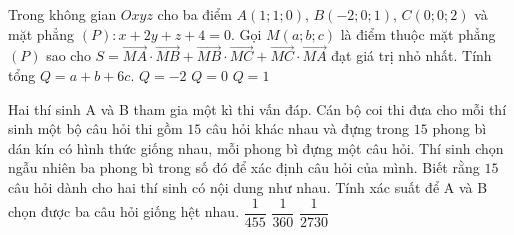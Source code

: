 \begin{ex}%
Trong không gian $Oxyz$ cho ba điểm $A(1;1;0)$, $B(-2;0;1)$, $C(0;0;2)$ và mặt phẳng $(P)\colon x+2y+z+4=0$. Gọi $M(a;b;c)$ là điểm thuộc mặt phẳng $(P)$ sao cho $S=\overrightarrow{MA}\cdot\overrightarrow{MB}+\overrightarrow{MB}\cdot\overrightarrow{MC}+\overrightarrow{MC}\cdot\overrightarrow{MA}$ đạt giá trị nhỏ nhất. Tính tổng $Q=a+b+6c$.
{\True $Q=-2$}
{$Q=0$}
{$Q=1$}
\end{ex}

\begin{ex}%
Hai thí sinh A và B tham gia một kì thi vấn đáp. Cán bộ coi thi đưa cho mỗi thí sinh một bộ câu hỏi thi gồm $15$ câu hỏi khác nhau và đựng trong $15$ phong bì dán kín có hình thức giống nhau, mỗi phong bì đựng một câu hỏi. Thí sinh chọn ngẫu nhiên ba phong bì trong số đó để xác định câu hỏi của mình. Biết rằng $15$ câu hỏi dành cho hai thí sinh có nội dung như nhau. Tính xác suất để A và B chọn được ba câu hỏi giống hệt nhau.
{\True $\dfrac{1}{455}$}
{$\dfrac{1}{360}$}
{$\dfrac{1}{2730}$}
\end{ex}

